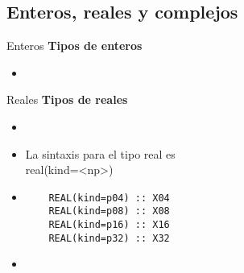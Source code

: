
\subsection{Enteros, reales y complejos}

\begin{frame}[fragile]{Enteros}
\textbf{Tipos de enteros}
 \begin{itemize}[<+(0)->]
  \item 
 \end{itemize}
\end{frame}

\begin{frame}[fragile]{Reales}
\textbf{Tipos de reales}
 \begin{itemize}[<+(1)->]
  \item 
  \item La sintaxis para el tipo real es\\ 
   \centering real(kind=<np>)
  \vspace{6pt}
  \item []
   \begin{verbatim}
    REAL(kind=p04) :: X04
    REAL(kind=p08) :: X08
    REAL(kind=p16) :: X16
    REAL(kind=p32) :: X32
   \end{verbatim}
  \item[] 
 \end{itemize}
\end{frame}

